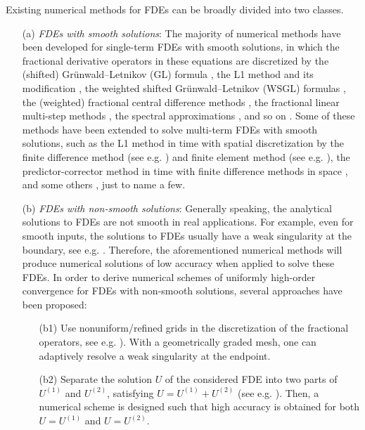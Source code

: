 \documentclass[10pt]{siamltex}
\begin{document}
Existing numerical methods for FDEs
can be broadly divided into two classes.
\begin{itemize}
\item[(a)] {\em FDEs with smooth solutions}: The majority of numerical methods
have been developed   for single-term
FDEs with smooth solutions, in which    the fractional derivative
operators in these equations are discretized by the  (shifted)
Gr\"{u}nwald--Letnikov (GL) formula \cite{ChenLTA07,GaoSS15,MeeTad04,Pod-B99},
the L1 method and its modification
\cite{LinXu07,ZhangSunLiao14},
the weighted shifted Gr\"{u}nwald--Letnikov (WSGL) formulas \cite{TianZD14,WangVong14b},
the (weighted) fractional central difference methods
\cite{CelikDuman12,DingLC14a,DingLC14b,ZhaoSH14},
the fractional linear multi-step methods
\cite{CueLubPal06,Lub86,Yuste06,Zeng14,ZengLLT13,ZengLLT15,ZengZK16},
the spectral approximations \cite{ZayKar14b,ZengZK15,ZhengLATS15},
and so on \cite{ChenDeng14,ForMR13,MusMcL13,Sousa12}.
Some of these methods have been extended to solve
multi-term   FDEs with smooth solutions,
such as  the L1 method in time with spatial discretization by
the finite difference method (see e.g. \cite{Liu-etal13,RenSun14})
and   finite element method (see e.g. \cite{JinLaz-etal15}),
the predictor-corrector method in time with finite difference methods
in space \cite{Liu-etal13,YeLiu14}, {and some others \cite{FordCon09,PdeasTamme11},
just to name a few.}



\item[(b)]  {\em FDEs with non-smooth solutions}: Generally speaking, the analytical solutions
to FDEs are not smooth in real applications. For example, even for smooth inputs,
the solutions to FDEs usually have a weak singularity at the boundary, see e.g.
\cite{Diethelm-B10,JinZhou14,Luchko11,MaoShen16,WangZhang15,ZhangZK15}.
Therefore, the aforementioned numerical methods will produce numerical
solutions of low accuracy when applied to solve these FDEs. In order to derive numerical schemes
of uniformly high-order convergence for FDEs with non-smooth solutions,
several approaches have been proposed:
\begin{itemize}
\item[(b1)]   Use nonuniform/refined grids in the discretization of the fractional operators, see e.g. \cite{McLMus07,MusMcL13,QuiYus13,ZhangSunLiao14}). With a geometrically graded mesh, one can adaptively resolve a weak singularity at the endpoint.
\item[(b2)]  Separate the solution $U$ of the considered FDE into two parts of
$U^{(1)}$  and $U^{(2)}$, satisfying
    $U=U^{(1)}+U^{(2)}$ (see e.g. \cite{Lub86,Zeng14,ZengLLT15}). Then,
    a numerical scheme is designed such that high accuracy is obtained for both $U=U^{(1)}$ and $U=U^{(2)}$.


\end{itemize}
\end{itemize}
\end{document}
